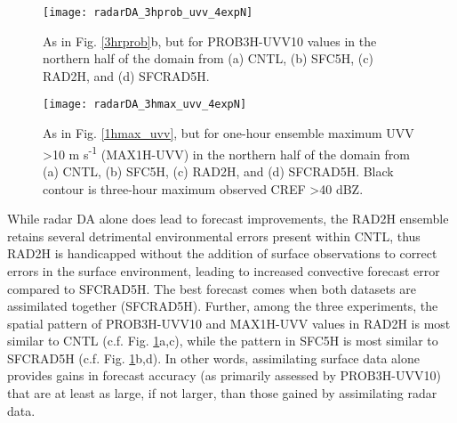 \begin{figure}
\centering
\texttt{[image: radarDA\_3hprob\_uvv\_4expN]}
\caption{As in Fig. \ref{3hrprob}b, but for PROB3H-UVV10 values in the northern half of the domain from (a) CNTL, (b) SFC5H, (c) RAD2H, and (d) SFCRAD5H.}
\label{3hprobuvv4expN}
\end{figure}
\begin{figure}
\centering
\texttt{[image: radarDA\_3hmax\_uvv\_4expN]}
\caption{As in Fig. \ref{1hmax_uvv}, but for one-hour ensemble maximum UVV \textgreater 10 m s\textsuperscript{-1} (MAX1H-UVV) in the northern half of the domain from (a) CNTL, (b) SFC5H, (c) RAD2H, and (d) SFCRAD5H. Black contour is three-hour maximum observed CREF \textgreater 40 dBZ.}
\label{3hmaxuvv4expN}
\end{figure}

While radar DA alone does lead to forecast improvements, the RAD2H ensemble retains several detrimental environmental errors present within CNTL, thus RAD2H is handicapped without the addition of surface observations to correct errors in the surface environment, leading to increased convective forecast error compared to SFCRAD5H. The best forecast comes when both datasets are assimilated together (SFCRAD5H). Further, among the three experiments, the spatial pattern of PROB3H-UVV10 and MAX1H-UVV values in RAD2H is most similar to CNTL (c.f. Fig. \ref{3hprobuvv4expN}a,c), while the pattern in SFC5H is most similar to SFCRAD5H (c.f. Fig. \ref{3hprobuvv4expN}b,d). In other words, assimilating surface data alone provides gains in forecast accuracy (as primarily assessed by PROB3H-UVV10) that are at least as large, if not larger, than those gained by assimilating radar data.

